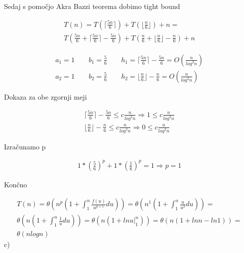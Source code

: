 \documentclass[12pt]{article}
\begin{document}
    Sedaj s pomočjo Akra Bazzi teorema dobimo tight bound

    \begin{equation}
      \begin{gathered}
        T(n) = T(\lceil{\frac{5n}{6}}\rceil) + T(\lfloor{\frac{n}{6}}\rfloor) + n =\\
        T(\frac{5n}{6} + \lceil{\frac{5n}{6}}\rceil - \frac{5n}{6}) + T(\frac{n}{6} + \lfloor{\frac{n}{6}}\rfloor - \frac{n}{6}) + n
      \end{gathered}
    \end{equation}

    \begin{equation}
      \begin{aligned}
        a_1 = 1\qquad b_1 = \frac{5}{6}\qquad h_1=\lceil{\frac{5n}{6}}\rceil - \frac{5n}{6} = O(\frac{n}{log^2n})\\
        a_2 = 1\qquad b_2 = \frac{5}{6}\qquad h_2=\lfloor{\frac{n}{6}}\rfloor - \frac{n}{6} = O(\frac{n}{log^2n})
      \end{aligned}
    \end{equation}

    Dokaza za obe zgornji meji

    \begin{equation}
      \begin{aligned}
        \lceil{\frac{5n}{6}}\rceil - \frac{5n}{6} \leq c\frac{n}{log^2n} \Rightarrow 1 \leq c\frac{n}{log^2n}\\
        \lfloor{\frac{n}{6}}\rfloor - \frac{n}{6} \leq c\frac{n}{log^2n} \Rightarrow 0 \leq c\frac{n}{log^2n}
      \end{aligned}
    \end{equation}

    Izračunamo p

    \begin{align}
      1 * (\frac{5}{6})^p + 1 * (\frac{1}{6})^p = 1 \Rightarrow p = 1
    \end{align}

    Končno

    \begin{equation}
      \begin{gathered}
        T(n) = \theta(n^p(1 + \int_{1}^{n}{\frac{f(u)}{u^{p+1}}du})) = \theta(n^1(1 + \int_{1}^{n}{\frac{u}{u^2}du})) =\\
        \theta(n(1 + \int_{1}^{n}{\frac{1}{u}du})) = \theta(n(1 + lnu\rvert_{1}^{n})) = \theta(n(1 + lnn - ln1)) =\\
        \theta(nlogn)
      \end{gathered}
    \end{equation}
    c)
\end{document}
